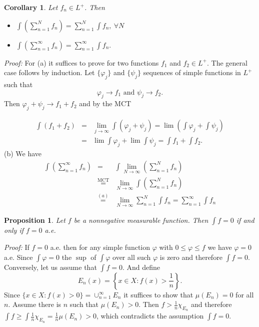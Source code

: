 \documentclass[12pt]{report}
\newtheorem{corollary}[theorem]{Corollary}
\newtheorem{prop}[theorem]{Proposition}
\begin{document}
\begin{corollary}  Let $f_n \in L^+$.  Then
\begin{itemize}
\item[(a)] $\displaystyle{\int \left ( \sum^N_{n=1} f_n\right ) =
\sum^N_{n=1}
\int f_n, \ \forall N}$\\
\item[(b)] $\displaystyle{\int \left ( \sum^\infty_{n=1} f_n\right ) =
\sum^\infty_{n=1} \int f_n.}$
\end{itemize}
\end{corollary}
\noindent
\textit{Proof:}  For (a) it suffices to prove for two functions $f_1$ and
$f_2
\in  L^+$.  The general case follows by induction.  Let $\{\varphi_j\}$ and
$\{\psi_j\}$ sequences of simple functions in $L^+$ such that 
\[
\varphi_j \longrightarrow f_1 \mbox{ and } \psi_j \longrightarrow f_2.
\] Then $\varphi_j + \psi_j \longrightarrow f_1 + f_2$ and by the MCT

\begin{eqnarray*}
\int(f_1 + f_2) &=& \lim_{j\to \infty} \int (\varphi_j + \psi_j) =
\lim(\int \varphi_j +\int \psi_j)\\ &= &\lim \int \varphi_j + \lim \int
\psi_j = \int f_1 + \int f_2.
\end{eqnarray*}
\noindent
(b)  We have
\begin{eqnarray*} 
 \int \left ( \sum^\infty_{n=1} f_n \right ) &=& \int \lim_{N \to\infty}
\left (\sum^N_{n=1} f_n \right )\\ &\stackrel{\mbox{MCT}}{=}& \lim_{N
\to \infty} \int \left (\sum^N_{n=1} f_n\right )\\ &\stackrel{(a)}{=}&
\lim_{N \to \infty} \sum^N_{n=1} \int f_n =
\sum^\infty_{n=1} \int f_n
\end{eqnarray*}

\begin{prop} Let $f$ be a nonnegative measurable
function.  Then
$\int f = 0$ if and only if $f = 0$ a.e.
\end{prop}
\textit{Proof:}  
If $f = 0$ a.e. then for any simple function $\varphi$
with  $0 \le
\varphi \le f$ we have $\varphi = 0$ a.e.  Since $\int \varphi = 0$  the
$\sup$ of
$\int \varphi$ over all such $\varphi$ is zero and therefore $\int f = 0$. 
Conversely, let us assume that $\int f = 0$.  And define
\[ E_n (x) = \left \{x \in X: f(x) > \frac{1}{n} \right \}.
\] Since $\{x \in X: f(x) > 0\} = {\cup}^\infty_{n=1}
E_n$ it suffices to show that
$\mu(E_n) = 0$ for all $n$.   Assume there is $n$ such that
$\mu(E_n) > 0$.  Then $f >
\frac{1}{n} \chi_{E_n}$ and therefore $\int f \ge \int \frac{1}{n}
\chi_{E_n} = \frac{1}{n} \mu (E_n) > 0$, which contradicts the
assumption
$\int f = 0$. 
\end{document}
